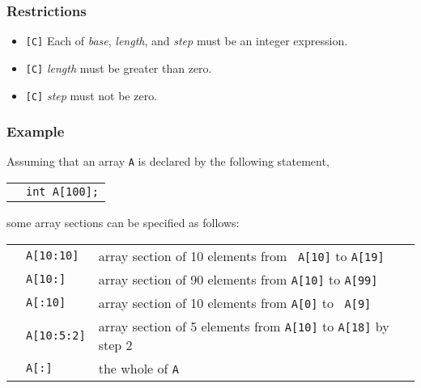 \subsubsection*{Restrictions}

\begin{itemize}
 \item \verb![C]! Each of {\it base}, {\it length}, and {\it step} must
       be an integer expression.
 \item \verb![C]! {\it length} must be greater than zero.
 \item \verb![C]! {\it step} must not be zero.
\end{itemize}

\subsubsection*{Example}

Assuming that an array {\tt A} is declared by the following statement,

\vspace{0.3cm}

\begin{tabular}{ll}
\hspace{0.5cm} & {\tt int A[100];} \\
\end{tabular}

\vspace{0.3cm}

\hspace{-0.55cm}some array sections can be specified as follows:

\vspace{0.3cm}

\begin{tabular}{lll}
\hspace{0.5cm} & {\tt A[10:10]} & array section of 10 elements from {\tt
 A[10]} to {\tt A[19]} \\
 & {\tt A[10:]} & array section of 90 elements from
		  {\tt A[10]} to {\tt A[99]}\\
 & {\tt A[:10]} & array section of 10 elements from {\tt A[0]} to {\tt
	 A[9]} \\
 & {\tt A[10:5:2]} & array section of 5 elements from {\tt A[10]} to
	 {\tt A[18]} by step 2 \\
 & {\tt A[:]} & the whole of {\tt A} \\
\end{tabular}

